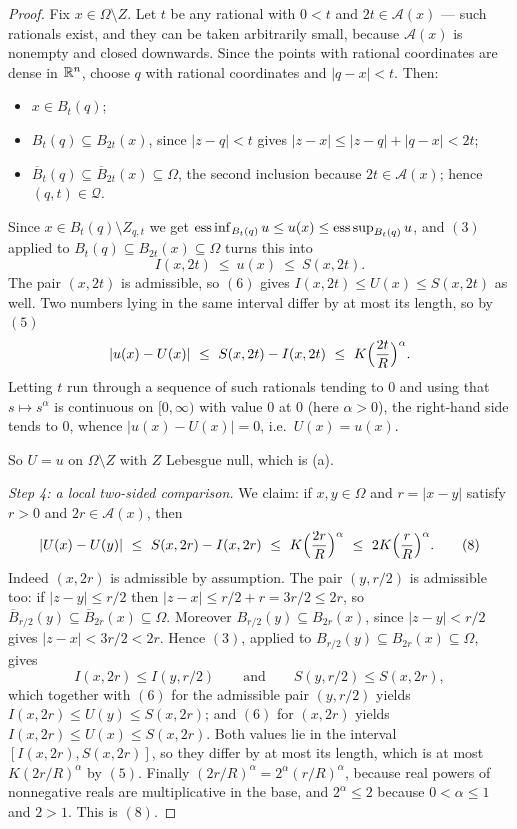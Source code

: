 \begin{proof}
Fix $x\in\Omega\setminus Z$.  Let $t$ be any rational with $0<t$ and
$2t\in\mathcal A(x)$ --- such rationals exist, and they can be taken
arbitrarily small, because $\mathcal A(x)$ is nonempty and closed downwards.
Since the points with rational coordinates are dense in $\mathbb{R}^n$, choose $q$ with
rational coordinates and $|q-x|<t$.  Then:
\begin{itemize}
\item $x\in B_t(q)$;
\item $B_t(q)\subseteq B_{2t}(x)$, since $|z-q|<t$ gives
  $|z-x|\le|z-q|+|q-x|<2t$;
\item $\overline B_t(q)\subseteq\overline B_{2t}(x)\subseteq\Omega$, the second
  inclusion because $2t\in\mathcal A(x)$; hence $(q,t)\in\mathcal Q$.
\end{itemize}
Since $x\in B_t(q)\setminus Z_{q,t}$ we get
$\operatorname*{ess\,inf}_{B_t(q)}u\le u(x)\le
\operatorname*{ess\,sup}_{B_t(q)}u$, and $(3)$ applied to
$B_t(q)\subseteq B_{2t}(x)\subseteq\Omega$ turns this into
\[
I(x,2t)\ \le\ u(x)\ \le\ S(x,2t).
\]
The pair $(x,2t)$ is admissible, so $(6)$ gives $I(x,2t)\le U(x)\le S(x,2t)$ as
well.  Two numbers lying in the same interval differ by at most its length, so
by $(5)$
\[
|u(x)-U(x)|\ \le\ S(x,2t)-I(x,2t)\ \le\ K\Bigl(\frac{2t}R\Bigr)^{\alpha} .
\]
Letting $t$ run through a sequence of such rationals tending to $0$ and using
that $s\mapsto s^{\alpha}$ is continuous on $[0,\infty)$ with value $0$ at $0$
(here $\alpha>0$), the right-hand side tends to $0$, whence $|u(x)-U(x)|=0$,
i.e.\ $U(x)=u(x)$.

So $U=u$ on $\Omega\setminus Z$ with $Z$ Lebesgue null, which is (a).

\emph{Step 4: a local two-sided comparison.}  We claim: if $x,y\in\Omega$ and
$r=|x-y|$ satisfy $r>0$ and $2r\in\mathcal A(x)$, then
\[
|U(x)-U(y)|\ \le\ S(x,2r)-I(x,2r)\ \le\ K\Bigl(\frac{2r}R\Bigr)^{\alpha}
\ \le\ 2K\Bigl(\frac rR\Bigr)^{\alpha} .
\tag{8}
\]
Indeed $(x,2r)$ is admissible by assumption.  The pair $(y,r/2)$ is admissible
too: if $|z-y|\le r/2$ then $|z-x|\le r/2+r=3r/2\le2r$, so
$\overline B_{r/2}(y)\subseteq\overline B_{2r}(x)\subseteq\Omega$.  Moreover
$B_{r/2}(y)\subseteq B_{2r}(x)$, since $|z-y|<r/2$ gives
$|z-x|<3r/2<2r$.  Hence $(3)$, applied to
$B_{r/2}(y)\subseteq B_{2r}(x)\subseteq\Omega$, gives
\[
I(x,2r)\le I(y,r/2)\qquad\text{and}\qquad S(y,r/2)\le S(x,2r),
\]
which together with $(6)$ for the admissible pair $(y,r/2)$ yields
$I(x,2r)\le U(y)\le S(x,2r)$; and $(6)$ for $(x,2r)$ yields
$I(x,2r)\le U(x)\le S(x,2r)$.  Both values lie in the interval
$[I(x,2r),S(x,2r)]$, so they differ by at most its length, which is at most
$K(2r/R)^{\alpha}$ by $(5)$.  Finally
$(2r/R)^{\alpha}=2^{\alpha}(r/R)^{\alpha}$, because real powers of nonnegative
reals are multiplicative in the base, and $2^{\alpha}\le2$ because
$0<\alpha\le1$ and $2>1$.  This is $(8)$.


\end{proof}
